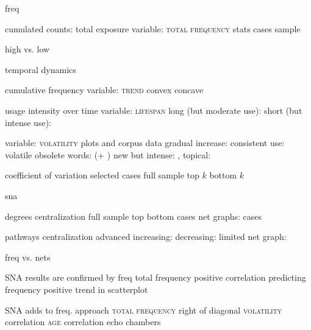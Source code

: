
freq

  cumulated counts: total exposure
    variable: \textsc{total frequency}
    stats
      cases
      sample

    high vs. low

  temporal dynamics

    cumulative frequency
      variable: \textsc{trend}
        convex
        concave

    usage intensity over time
      variable: \textsc{lifespan}
        long (but moderate use): 
        short (but intense use): 

      variable: \textsc{volatility}
        plots and corpus data
          gradual increase: 
          consistent use: 
          volatile
            obsolete words:  (+ )
            new but intense: , 
            topical: 

        coefficient of variation
          selected cases
          full sample
            top $k$
            bottom $k$

sna

  degrees
    centralization
      full sample
        top
        bottom
      cases
    net graphs: cases

  pathways
    centralization
      advanced
      increasing:
      decreasing:
      limited
    net graph: 

freq vs. nets


  SNA results are confirmed by freq
    total frequency
      positive correlation
      predicting frequency
      positive trend in scatterplot

  SNA adds to freq. approach
    \textsc{total frequency}
      right of diagonal
    \textsc{volatility}
      correlation
    \textsc{age}
      correlation
    echo chambers
